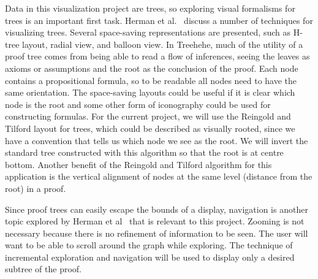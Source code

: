 \documentclass[12pt]{article}
\newcommand{\projectname}{Treehehe}
\begin{document}



Data in this visualization project are trees, so exploring visual formalisms for trees is an important first task. Herman et al.~\cite{graphvis-herman+melancon+marshall} discuss a number of techniques for visualizing trees. Several space-saving representations are presented, such as H-tree layout, radial view, and balloon view. In \projectname{}, much of the utility of a proof tree comes from being able to read a flow of inferences, seeing the leaves as axioms or assumptions and the root as the conclusion of the proof. Each node contains a propositional formula, so to be readable all nodes need to have the same orientation. The space-saving layouts could be useful if it is clear which node is the root and some other form of iconography could be used for constructing formulas. For the current project, we will use the Reingold and Tilford layout for trees, which could be described as visually rooted, since we have a convention that tells us which node we see as the root. We will invert the standard tree constructed with this algorithm so that the root is at centre bottom. Another benefit of the Reingold and Tilford algorithm for this application is the vertical alignment of nodes at the same level (distance from the root) in a proof.

Since proof trees can easily escape the bounds of a display, navigation is another topic explored by Herman et al~\cite{graphvis-herman+melancon+marshall} that is relevant to this project. Zooming is not necessary because there is no refinement of information to be seen. The user will want to be able to scroll around the graph while exploring. The technique of incremental exploration and navigation will be used to display only a desired subtree of the proof.
\end{document}
